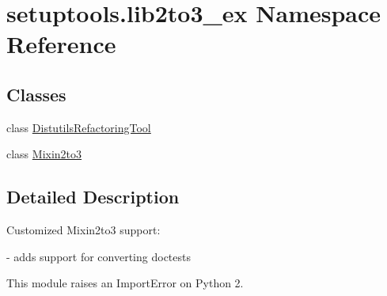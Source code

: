 \hypertarget{namespacesetuptools_1_1lib2to3__ex}{}\section{setuptools.\+lib2to3\+\_\+ex Namespace Reference}
\label{namespacesetuptools_1_1lib2to3__ex}
\subsection*{Classes}
\begin{DoxyCompactItemize}
\item 
class \hyperlink{classsetuptools_1_1lib2to3__ex_1_1_distutils_refactoring_tool}{Distutils\+Refactoring\+Tool}
\item 
class \hyperlink{classsetuptools_1_1lib2to3__ex_1_1_mixin2to3}{Mixin2to3}
\end{DoxyCompactItemize}


\subsection{Detailed Description}
\begin{DoxyVerb}Customized Mixin2to3 support:

 - adds support for converting doctests


This module raises an ImportError on Python 2.
\end{DoxyVerb}
 